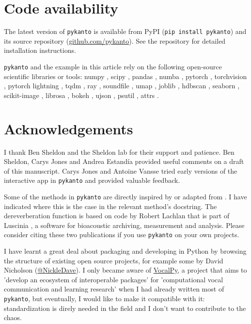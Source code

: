 \section{Code availability}

The latest version of \texttt{pykanto} is available from PyPI (\texttt{pip install
pykanto}) and its source repository (\href{https://github.com/nilomr/pykanto}{github.com/pykanto}). See the repository for detailed installation instructions.

\noindent \texttt{pykanto} and the example in this article rely on the following open-source scientific
libraries or tools: numpy \parencite{numpy2020}, scipy \parencite{scipy2020}, pandas
\parencite{pandas2023}, numba \parencite{lam2015}, pytorch \parencite{pytorch2019},
torchvision \parencite{torchvision2016}, pytorch lightning
\parencite{pytorchlightning2019}, tqdm \parencite{tqdm2019}, ray \parencite{moritz2018},
soundfile \parencite{bechtold2022}, umap \parencite{mcinnes2018},  joblib
\parencite{joblib2020}, hdbscan \parencite{mcinnes2017}, seaborn \parencite{Waskom2021},
scikit-image \parencite{scikitimage2014}, librosa \parencite{mcfee2015}, bokeh
\parencite{bokeh2018}, ujson \parencite{ujason2023}, psutil \parencite{psutil2023}, attrs
\parencite{schlawack2019}.

\section{Acknowledgements}

I thank Ben Sheldon and the Sheldon lab for their support and
patience. Ben Sheldon, Carys Jones and Andrea Estandía provided useful comments on a draft of this
manuscript. Carys Jones and Antoine Vansse tried early versions of the
interactive app in \texttt{pykanto} and provided valuable feedback.

Some of the methods in \texttt{pykanto} are directly inspired by or adapted
from \cite{sainburg2020}. I have indicated where
this is the case in the relevant method's docstring. The dereverberation
function is based on code by Robert Lachlan that is part of Luscinia
\parencite{lachlan2016a}, a software for bioacoustic archiving, measurement and
analysis. Please consider citing these two publications if you use
\texttt{pykanto} on your own projects.

I have learnt a great deal about packaging and developing in Python by browsing
the structure of existing open source projects, for example some by David
Nicholson (\href{https://github.com/NickleDave/NickleDave}{@NickleDave}). I only
became aware of \href{https://github.com/vocalpy}{VocalPy}, a project that aims
to 'develop an ecosystem of interoperable packages' for
'computational vocal communication and learning research' when I had
already written most of \texttt{pykanto}, but eventually, I would like to make it
compatible with it: standardization is direly needed in the field and I don't
want to contribute to the chaos.

